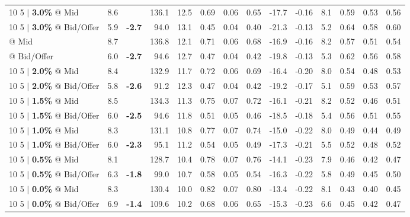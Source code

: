 \documentclass{beamer}
\begin{document}
\begin{frame}
\begin{table}
{\begin{tabular}{lrcrrrrrrrrrrr}
\addlinespace
{10 5 $|$ \bf 3.0\%} @ Mid & 8.6 & & 136.1 & 12.5 & 0.69 & 0.06 & 0.65 & -17.7 & -0.16 & 8.1 & 0.59 & 0.53 & 0.56\\
{10 5 $|$ \bf 3.0\%} @ Bid/Offer & 5.9 & {\bf \color{red}-2.7} & 94.0 & 13.1 & 0.45 & 0.04 & 0.40 & -21.3 & -0.13 & 5.2 & 0.64 & 0.58 & 0.60\\
\addlinespace
\color{blue}{10 5 $|$ \bf 2.5\%} @ Mid & 8.7 & & 136.8 & 12.1 & 0.71 & 0.06 & 0.68 & -16.9 & -0.16 & 8.2 & 0.57 & 0.51 & 0.54\\
\color{blue}{10 5 $|$ \bf 2.5\%} @ Bid/Offer & 6.0 & {\bf \color{red}-2.7} & 94.6 & 12.7 & 0.47 & 0.04 & 0.42 & -19.8 & -0.13 & 5.3 & 0.62 & 0.56 & 0.58\\
\addlinespace
{10 5 $|$ \bf 2.0\%} @ Mid & 8.4 & & 132.9 & 11.7 & 0.72 & 0.06 & 0.69 & -16.4 & -0.20 & 8.0 & 0.54 & 0.48 & 0.53\\
{10 5 $|$ \bf 2.0\%} @ Bid/Offer & 5.8 & {\bf \color{red}-2.6} & 91.2 & 12.3 & 0.47 & 0.04 & 0.42 & -19.2 & -0.17 & 5.1 & 0.59 & 0.53 & 0.57\\
\addlinespace
{10 5 $|$ \bf 1.5\%} @ Mid & 8.5 & & 134.3 & 11.3 & 0.75 & 0.07 & 0.72 & -16.1 & -0.21 & 8.2 & 0.52 & 0.46 & 0.51\\
{10 5 $|$ \bf 1.5\%} @ Bid/Offer & 6.0 & {\bf \color{red}-2.5} & 94.6 & 11.8 & 0.51 & 0.05 & 0.46 & -18.5 & -0.18 & 5.4 & 0.56 & 0.51 & 0.55\\
\addlinespace
{10 5 $|$ \bf 1.0\%} @ Mid & 8.3 & & 131.1 & 10.8 & 0.77 & 0.07 & 0.74 & -15.0 & -0.22 & 8.0 & 0.49 & 0.44 & 0.49\\
{10 5 $|$ \bf 1.0\%} @ Bid/Offer & 6.0 & {\bf \color{red}-2.3} & 95.1 & 11.2 & 0.54 & 0.05 & 0.49 & -17.3 & -0.21 & 5.5 & 0.52 & 0.48 & 0.52\\
\addlinespace
{10 5 $|$ \bf 0.5\%} @ Mid & 8.1 & & 128.7 & 10.4 & 0.78 & 0.07 & 0.76 & -14.1 & -0.23 & 7.9 & 0.46 & 0.42 & 0.47\\
{10 5 $|$ \bf 0.5\%} @ Bid/Offer & 6.3 & {\bf \color{red}-1.8} & 99.0 & 10.7 & 0.58 & 0.05 & 0.54 & -16.3 & -0.22 & 5.8 & 0.49 & 0.45 & 0.50\\
\addlinespace
{10 5 $|$ \bf 0.0\%} @ Mid & 8.3 & & 130.4 & 10.0 & 0.82 & 0.07 & 0.80 & -13.4 & -0.22 & 8.1 & 0.43 & 0.40 & 0.45\\
{10 5 $|$ \bf 0.0\%} @ Bid/Offer & 6.9 & {\bf \color{red}-1.4} & 109.6 & 10.2 & 0.68 & 0.06 & 0.65 & -15.3 & -0.23 & 6.6 & 0.45 & 0.42 & 0.47\\
\bottomrule
\end{tabular}
}
\end{table}
\end{frame}
\end{document}
